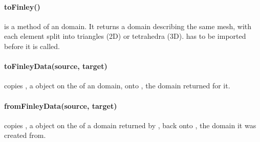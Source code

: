 \paragraph{toFinley()} is a method of an \oxley domain. It returns a \finley
domain describing the same mesh, with each element split into triangles (2D)
or tetrahedra (3D). \finley has to be imported before it is called.

\paragraph{toFinleyData(source, target)}
copies , a \Data object on the  of an
\oxley domain, onto , the \finley domain 
returned for it.

\paragraph{fromFinleyData(source, target)}
copies , a \Data object on the  of a
\finley domain returned by , back onto , the
\oxley domain it was created from.
